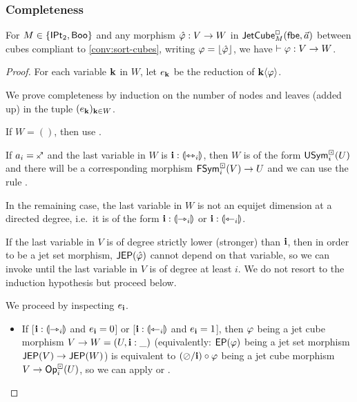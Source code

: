 \documentclass[a4paper]{memoir}
\begin{document}
\subsubsection{Completeness}
\begin{theorem}[Completeness] \label{thm:calculus-complete}
	For $M \in \mathopen{}\left\{ {\mathsf{IPt}_2}, \mathsf{Boo} \right\}\mathclose{}$ and any morphism $\hat {\varphi} : V \to W$ in $\mathsf{JetCube}^{\Box}_{M}\mathopen{}\left( {\mathsf{fbe}},\vec a \right)\mathclose{}$ between cubes compliant to \cref{conv:sort-cubes}, writing $\varphi = \mathopen{}\left\lfloor \hat {\varphi} \right\rfloor\mathclose{}$, we have $\vdash \varphi : V \to W$.
\end{theorem}
\begin{proof}
	For each variable $\mathbf{k}$ in $W$, let $e_{\mathbf{k}}$ be the reduction of $\mathbf{k} \langle \varphi \rangle$.

	We prove completeness by induction on the number of nodes and leaves (added up) in the tuple $(e_{\mathbf{k}})_{\mathbf{k} \in W}$.
	
	If $W = ()$, then use .
	
	If $a_i = \ypolar$ and the last variable in $W$ is $\mathbf{i} : {\llparenthesis \leftrightarrowtriangle_i \rrparenthesis}$, then $W$ is of the form $\mathsf{USym}^\boxdot_i(U)$ and there will be a corresponding morphism $\mathsf{FSym}^\boxdot_i(V) \to U$ and we can use the rule .
	
	In the remaining case, the last variable in $W$ is not an equijet dimension at a directed degree, i.e.\ it is of the form $\mathbf{i} : {\llparenthesis \rightarrowtriangle_i \rrparenthesis}$ or $\mathbf{i} : {\llparenthesis \leftarrowtriangle_i \rrparenthesis}$.
	
	If the last variable in $V$ is of degree strictly lower (stronger) than $\mathbf{i}$, then in order to be a jet set morphism, $\mathsf{JEP}(\hat {\varphi})$ cannot depend on that variable, so we can invoke  until the last variable in $V$ is of degree at least $i$. We do not resort to the induction hypothesis but proceed below.
	
	
	We proceed by inspecting $e_{\mathbf{i}}$.
	
	\begin{itemize}
		\item If [$\mathbf{i} : {\llparenthesis \rightarrowtriangle_i \rrparenthesis}$ and $e_{\mathbf{i}} = 0$] or [$\mathbf{i} : {\llparenthesis \leftarrowtriangle_i \rrparenthesis}$ and $e_{\mathbf{i}} = 1$], then $\varphi$ being a jet cube morphism $V \to W = (U, \mathbf{i} : \_)$ (equivalently: $\mathsf{EP}(\varphi)$ being a jet set morphism $\mathsf{JEP}(V) \to \mathsf{JEP}(W)$) is equivalent to $(\oslash / \mathbf{i}) \circ \varphi$ being a jet cube morphism $V \to {\mathsf{Op}}^\boxdot_i(U)$, so we can apply  or .
		

\end{itemize}
\end{proof}
\end{document}
